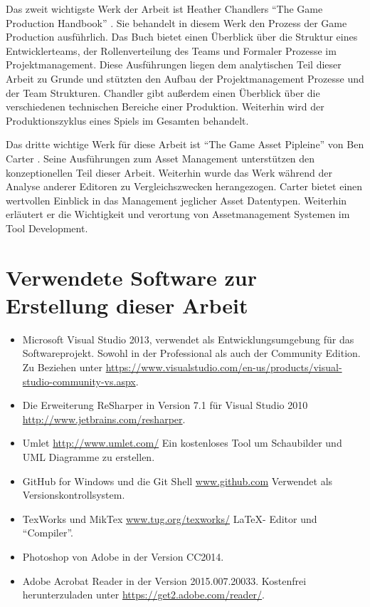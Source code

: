 \documentclass[pagesize, paper=a4, fontsize=12pt, titlepage=true, headings=small, headnosepline, abstractoff, liststotoc, nochapterprefix, plainheadsepline, twoside]{scrreprt}
\begin{document}
Das zweit wichtigste Werk der Arbeit ist Heather Chandlers “The Game Production Handbook” \parencite{Chandler2006}. Sie behandelt in diesem Werk den Prozess der Game Production ausführlich. Das Buch bietet einen Überblick über die Struktur eines Entwicklerteams, der Rollenverteilung des Teams und Formaler Prozesse im Projektmanagement. Diese Ausführungen liegen dem analytischen Teil dieser Arbeit zu Grunde und stützten den Aufbau der Projektmanagement Prozesse und der Team Strukturen. Chandler gibt außerdem einen Überblick über die verschiedenen technischen Bereiche einer Produktion. Weiterhin wird der Produktionszyklus eines Spiels im Gesamten behandelt.

Das dritte wichtige Werk für diese Arbeit ist “The Game Asset Pipleine” von Ben Carter \parencite{Carter2004}. Seine Ausführungen zum Asset Management unterstützen den konzeptionellen Teil dieser Arbeit. Weiterhin wurde das Werk während der Analyse anderer Editoren zu Vergleichszwecken herangezogen. Carter bietet einen wertvollen Einblick in das Management jeglicher Asset Datentypen. Weiterhin erläutert er die Wichtigkeit und verortung von Assetmanagement Systemen im Tool Development.

\section{Verwendete Software zur Erstellung dieser Arbeit}
\begin{itemize}
\item Microsoft Visual Studio 2013, \newline verwendet als Entwicklungsumgebung für das Softwareprojekt. Sowohl in der Professional als auch der Community Edition. Zu Beziehen unter  \url{https://www.visualstudio.com/en-us/products/visual-studio-community-vs.aspx}.
\item Die Erweiterung ReSharper in Version 7.1 für Visual Studio 2010 \url{http://www.jetbrains.com/resharper}.
\item Umlet \url{http://www.umlet.com/} \newline Ein kostenloses Tool um Schaubilder und UML Diagramme zu erstellen.
\item GitHub for Windows und die Git Shell \url{www.github.com} \newline Verwendet als Versionskontrollsystem.
\item TexWorks und MikTex \url{www.tug.org/texworks/} \newline \LaTeX- Editor und “Compiler”.
\item Photoshop von Adobe in der Version CC2014.
\item Adobe Acrobat Reader in der Version 2015.007.20033. Kostenfrei herunterzuladen unter \url{https://get2.adobe.com/reader/}.
\end{itemize}
\end{document}
